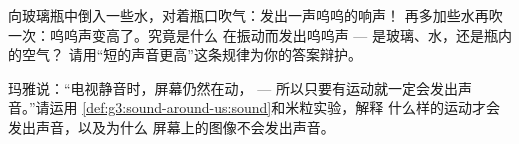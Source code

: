 \begin{exercise}[$\star\star$]\label{exo:g3:sound-around-us:10}
向玻璃瓶中倒入一些水，对着瓶口吹气：发出一声呜呜的响声！
再多加些水再吹一次：呜呜声变高了。究竟是什么
在振动而发出呜呜声 --- 是玻璃、水，还是瓶内的空气？
请用“短的声音更高”这条规律为你的答案辩护。
\end{exercise}

\begin{exercise}[$\star\star$]\label{exo:g3:sound-around-us:11}
玛雅说：“电视静音时，屏幕仍然在动，
--- 所以只要有运动就一定会发出声音。”请运用
\cref{def:g3:sound-around-us:sound}和米粒实验，解释
什么样的运动才会发出声音，以及为什么
屏幕上的图像不会发出声音。
\end{exercise}
